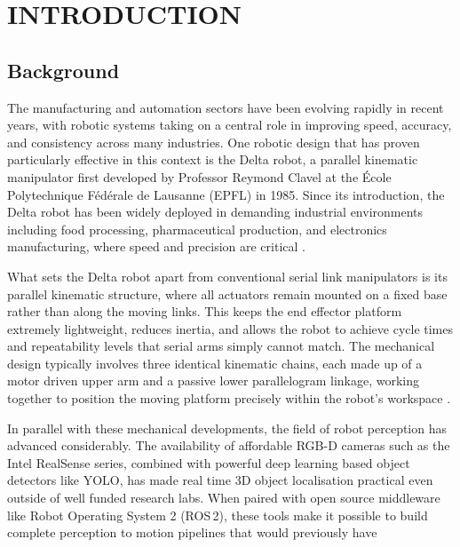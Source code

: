 \section{INTRODUCTION}

\subsection{Background}
\hspace{1.27cm}
The manufacturing and automation sectors have been evolving rapidly in recent years, with
robotic systems taking on a central role in improving speed, accuracy, and consistency
across many industries. One robotic design that has proven particularly effective in this
context is the Delta robot, a parallel kinematic manipulator first developed by Professor
Reymond Clavel at the \'{E}cole Polytechnique F\'{e}d\'{e}rale de Lausanne (EPFL) in 1985.
Since its introduction, the Delta robot has been widely deployed in demanding industrial
environments including food processing, pharmaceutical production, and electronics
manufacturing, where speed and precision are critical \autocite{clavel-1990}.
\par
\hspace{1.27cm}
What sets the Delta robot apart from conventional serial link manipulators is its parallel
kinematic structure, where all actuators remain mounted on a fixed base rather than along
the moving links. This keeps the end effector platform extremely lightweight, reduces
inertia, and allows the robot to achieve cycle times and repeatability levels that serial
arms simply cannot match. The mechanical design typically involves three identical kinematic
chains, each made up of a motor driven upper arm and a passive lower parallelogram linkage,
working together to position the moving platform precisely within the robot's workspace
\autocite{merlet-2006}.
\par
\hspace{1.27cm}
In parallel with these mechanical developments, the field of robot perception has advanced
considerably. The availability of affordable RGB-D cameras such as the Intel RealSense
series, combined with powerful deep learning based object detectors like YOLO, has made
real time 3D object localisation practical even outside of well funded research labs. When
paired with open source middleware like Robot Operating System 2 (ROS\,2), these tools make
it possible to build complete perception to motion pipelines that would previously have
